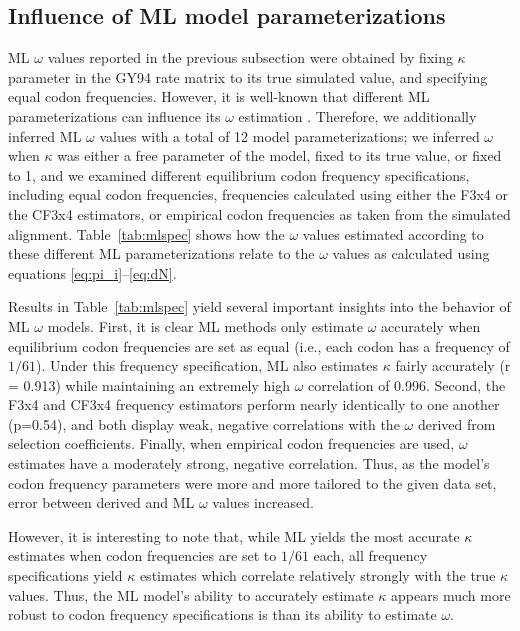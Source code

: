 \documentclass[11pt]{article}
\begin{document}
\subsection*{Influence of ML model parameterizations}

ML $\omega$ values reported in the previous subsection were obtained by fixing $\kappa$ parameter in the GY94 rate matrix to its true simulated value, and specifying equal codon frequencies. However, it is well-known that different ML parameterizations can influence its $\omega$ estimation \cite{YN00,Yang2006,ZhangYu2006}.  Therefore, we additionally inferred ML $\omega$ values with a total of 12 model parameterizations; we inferred $\omega$ when $\kappa$ was either a free parameter of the model, fixed to its true value, or fixed to 1, and we examined different equilibrium codon frequency specifications, including equal codon frequencies, frequencies calculated using either the F3x4 \cite{MuseGaut1994} or the CF3x4 \cite{Pond2010} estimators, or empirical codon frequencies as taken from the simulated alignment. Table~\ref{tab:mlspec} shows how the $\omega$ values estimated according to these different ML parameterizations relate to the $\omega$ values as calculated using equations \eqref{eq:pi_i}--\eqref{eq:dN}. 

Results in Table~\ref{tab:mlspec} yield several important insights into the behavior of ML $\omega$ models. First, it is clear ML methods only estimate $\omega$ accurately when equilibrium codon frequencies are set as equal (i.e., each codon has a frequency of $1/61$). Under this frequency specification, ML also estimates $\kappa$ fairly accurately (r = 0.913) while maintaining an extremely high $\omega$ correlation of 0.996. Second, the F3x4 and CF3x4 frequency estimators perform nearly identically to one another (p=0.54), and both display weak, negative correlations with the $\omega$ derived from selection coefficients. Finally, when empirical codon frequencies are used, $\omega$ estimates have a moderately strong, negative correlation. Thus, as the model's codon frequency parameters were more and more tailored to the given data set, error between derived and ML $\omega$ values increased.

However, it is interesting to note that, while ML yields the most accurate $\kappa$ estimates when codon frequencies are set to $1/61$ each, all frequency specifications yield $\kappa$ estimates which correlate relatively strongly with the true $\kappa$ values. Thus, the ML model's ability to accurately estimate $\kappa$ appears much more robust to codon frequency specifications is than its ability to estimate $\omega$.
\end{document}
